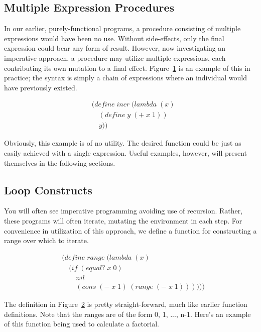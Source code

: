 \subsection{Multiple Expression Procedures}
In our earlier, purely-functional programs, a procedure consisting of multiple
expressions would have been no use. Without side-effects, only the final
expression could bear any form of result. However, now investigating an
imperative approach, a procedure may utilize multiple expressions, each
contributing its own mutation to a final effect.
Figure~\ref{fig:multiExprExample} is an example of this in practice; the syntax
is simply a chain of expressions where an individual would have previously
existed.

\begin{figure}[htp]
\footnotesize
\caption{}\label{fig:multiExprExample}
\begin{align*}
& (define \; incr \; (lambda \; (x)
\\& \quad (define \; y \; (+ \; x \; 1))
\\& \quad y))
\end{align*}
\end{figure}

Obviously, this example is of no utility. The desired function could be just as 
easily achieved with a single expression. Useful examples, however, will present 
themselves in the following sections.

\subsection{Loop Constructs}
You will often see imperative programming avoiding use of recursion. Rather, these 
programs will often iterate, mutating the environment in each step. For convenience 
in utilization of this approach, we define a function for constructing a range over 
which to iterate.

\begin{figure}[htp]
\footnotesize
\caption{}\label{fig:rangeLoopDef}
\begin{align*}
& (define \; range \; (lambda \; (x)
\\& \quad (if \; (equal? \; x \; 0)
\\& \qquad nil
\\& \qquad (cons \; (- \; x \; 1) \; (range \; (- \; x \; 1))))))
\end{align*}
\end{figure}

The definition in Figure~\ref{fig:rangeLoopDef} is pretty straight-forward,
much like earlier function definitions. Note that the ranges are of the form 0,
1, ..., n-1. Here's an example of this function being used to calculate a
factorial.

